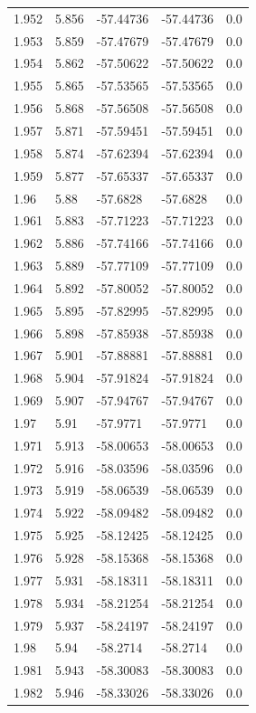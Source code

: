 \begin{tabular}{lllll}
1.952 & 5.856 & -57.44736 & -57.44736 & 0.0 \\
1.953 & 5.859 & -57.47679 & -57.47679 & 0.0 \\
1.954 & 5.862 & -57.50622 & -57.50622 & 0.0 \\
1.955 & 5.865 & -57.53565 & -57.53565 & 0.0 \\
1.956 & 5.868 & -57.56508 & -57.56508 & 0.0 \\
1.957 & 5.871 & -57.59451 & -57.59451 & 0.0 \\
1.958 & 5.874 & -57.62394 & -57.62394 & 0.0 \\
1.959 & 5.877 & -57.65337 & -57.65337 & 0.0 \\
1.96 & 5.88 & -57.6828 & -57.6828 & 0.0 \\
1.961 & 5.883 & -57.71223 & -57.71223 & 0.0 \\
1.962 & 5.886 & -57.74166 & -57.74166 & 0.0 \\
1.963 & 5.889 & -57.77109 & -57.77109 & 0.0 \\
1.964 & 5.892 & -57.80052 & -57.80052 & 0.0 \\
1.965 & 5.895 & -57.82995 & -57.82995 & 0.0 \\
1.966 & 5.898 & -57.85938 & -57.85938 & 0.0 \\
1.967 & 5.901 & -57.88881 & -57.88881 & 0.0 \\
1.968 & 5.904 & -57.91824 & -57.91824 & 0.0 \\
1.969 & 5.907 & -57.94767 & -57.94767 & 0.0 \\
1.97 & 5.91 & -57.9771 & -57.9771 & 0.0 \\
1.971 & 5.913 & -58.00653 & -58.00653 & 0.0 \\
1.972 & 5.916 & -58.03596 & -58.03596 & 0.0 \\
1.973 & 5.919 & -58.06539 & -58.06539 & 0.0 \\
1.974 & 5.922 & -58.09482 & -58.09482 & 0.0 \\
1.975 & 5.925 & -58.12425 & -58.12425 & 0.0 \\
1.976 & 5.928 & -58.15368 & -58.15368 & 0.0 \\
1.977 & 5.931 & -58.18311 & -58.18311 & 0.0 \\
1.978 & 5.934 & -58.21254 & -58.21254 & 0.0 \\
1.979 & 5.937 & -58.24197 & -58.24197 & 0.0 \\
1.98 & 5.94 & -58.2714 & -58.2714 & 0.0 \\
1.981 & 5.943 & -58.30083 & -58.30083 & 0.0 \\
1.982 & 5.946 & -58.33026 & -58.33026 & 0.0 \\

\end{tabular}
